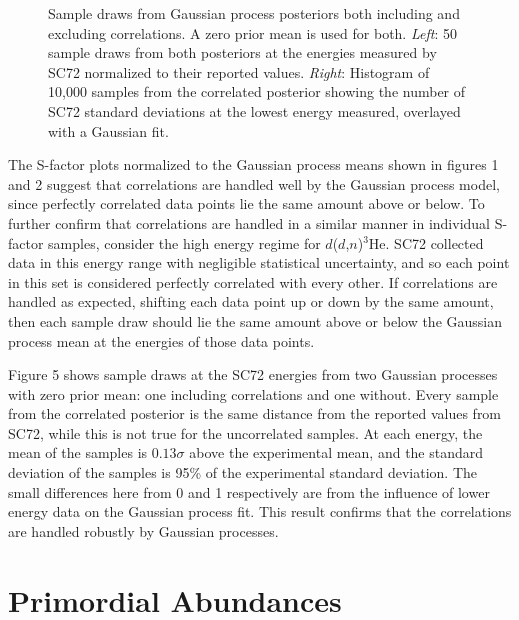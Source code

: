 \documentclass[%
 reprint,
superscriptaddress,
nofootinbib,
 amsmath,amssymb,
 aps,
 pra,
]{revtex4-2}
\begin{document}
\begin{figure}
\begin{minipage}{.48\textwidth}
    	\end{minipage}
	\caption{Sample draws from Gaussian process posteriors both including and excluding correlations. A zero prior mean is used for both. \textit{Left}: 50 sample draws from both posteriors at the energies measured by SC72 normalized to their reported values. \textit{Right}: Histogram of 10,000 samples from the correlated posterior showing the number of SC72 standard deviations at the lowest energy measured, overlayed with a Gaussian fit. }
\end{figure}

The S-factor plots normalized to the Gaussian process means shown in figures 1 and 2 suggest that correlations are handled well by the Gaussian process model, since perfectly correlated data points lie the same amount above or below. To further confirm that correlations are handled in a similar manner in individual S-factor samples, consider the high energy regime for $d$($d$,$n$)$^3$He. SC72 collected data in this energy range with negligible statistical uncertainty, and so each point in this set is considered perfectly correlated with every other. If correlations are handled as expected, shifting each data point up or down by the same amount, then each sample draw should lie the same amount above or below the Gaussian process mean at the energies of those data points. 

Figure 5 shows sample draws at the SC72 energies from two Gaussian processes with zero prior mean: one including correlations and one without. Every sample from the correlated posterior is the same distance from the reported values from SC72, while this is not true for the uncorrelated samples. At each energy, the mean of the samples is $0.13\sigma$ above the experimental mean, and the standard deviation of the samples is 95\% of the experimental standard deviation. The small differences here from 0 and 1 respectively are from the influence of lower energy data on the Gaussian process fit. This result confirms that the correlations are handled robustly by Gaussian processes. 



\section{Primordial Abundances}
\end{document}
